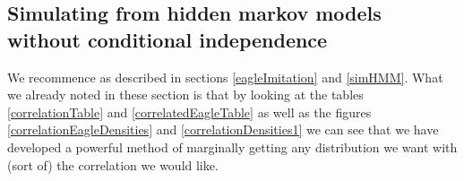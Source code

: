 \subsection{Simulating from hidden markov models without conditional independence}
We recommence as described in sections \ref{eagleImitation} and \ref{simHMM}. What we already noted in these section is that by looking at the tables \ref{correlationTable} and \ref{correlatedEagleTable} as well as the figures
\ref{correlationEagleDensities} and \ref{correlationDensities1} we can see that we have developed a powerful method of marginally getting any distribution we want with (sort of) the correlation we would like.
\subsubsection{}